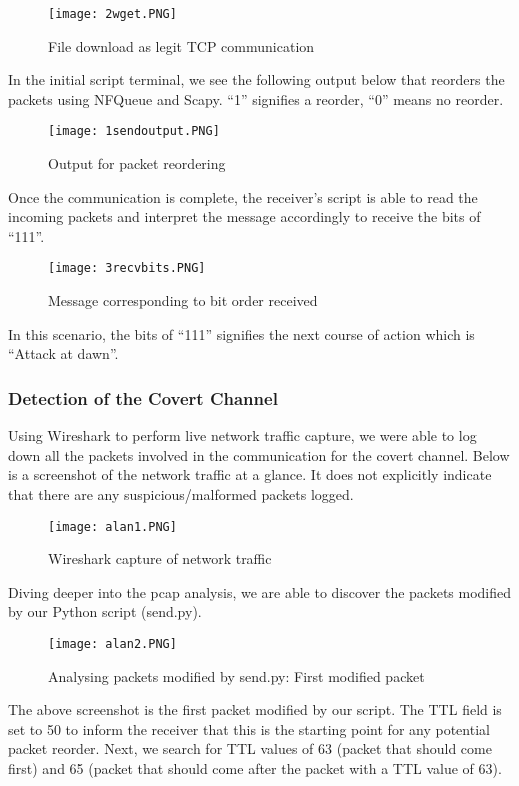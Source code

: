 \documentclass[letterpaper,twocolumn,10pt]{article}
\begin{document}
\begin{figure}[H]
    \centering
    \texttt{[image: 2wget.PNG]}
    \caption{File download as legit TCP communication}
\end{figure}

In the initial script terminal, we see the following output below that reorders the packets using NFQueue and Scapy. “1” signifies a reorder, “0” means no reorder.

\begin{figure}[H]
    \centering
    \texttt{[image: 1sendoutput.PNG]}
    \caption{Output for packet reordering}
\end{figure}

Once the communication is complete, the receiver’s script is able to read the incoming packets and interpret the message accordingly to receive the bits of “111”.

\begin{figure}[H]
    \centering
    \texttt{[image: 3recvbits.PNG]}
    \caption{Message corresponding to bit order received}
\end{figure}

In this scenario, the bits of “111” signifies the next course of action which is “Attack at dawn”.

\subsubsection{Detection of the Covert Channel}
Using Wireshark to perform live network traffic capture, we were able to log down all the packets involved in the communication for the covert channel. Below is a screenshot of the network traffic at a glance. It does not explicitly indicate that there are any suspicious/malformed packets logged.

\begin{figure}[H]
    \centering
    \texttt{[image: alan1.PNG]}
    \caption{Wireshark capture of network traffic}
\end{figure}

Diving deeper into the pcap analysis, we are able to discover the packets modified by our Python script (send.py).

\begin{figure}[H]
    \centering
    \texttt{[image: alan2.PNG]}
    \caption{Analysing packets modified by send.py: First modified packet}
\end{figure}

The above screenshot is the first packet modified by our script. The TTL field is set to 50 to inform the receiver that this is the starting point for any potential packet reorder. Next, we search for TTL values of 63 (packet that should come first) and 65 (packet that should come after the packet with a TTL value of 63). 
\end{document}
